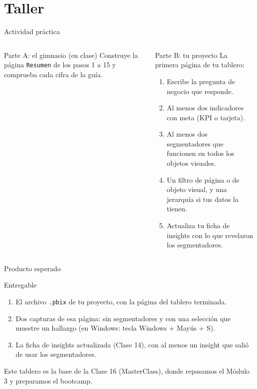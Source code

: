 \documentclass[aspectratio=169,11pt]{beamer}
\begin{document}
\section{Taller}
\begin{frame}[t]{Actividad práctica}
  \begin{columns}[T,onlytextwidth]
    \begin{block}{Parte A: el gimnasio (en clase)}
      \small Construye la página \texttt{Resumen} de los pasos 1 a 15 y
      comprueba cada cifra de la guía.
    \end{block}
    \begin{alertblock}{Parte B: tu proyecto}
      \small La primera página de tu tablero:
      \begin{enumerate}
        \footnotesize
        \item Escribe la pregunta de negocio que responde.
        \item Al menos dos indicadores con meta (KPI o tarjeta).
        \item Al menos dos segmentadores que funcionen en todos los
          objetos visuales.
        \item Un filtro de página o de objeto visual, y una jerarquía si
          tus datos la tienen.
        \item Actualiza tu ficha de insights con lo que revelaron los
          segmentadores.
      \end{enumerate}
    \end{alertblock}
  \end{columns}
\end{frame}

\begin{frame}[t]{Producto esperado}
  \begin{exampleblock}{Entregable}
    \small
    \begin{enumerate}
      \item El archivo \texttt{.pbix} de tu proyecto, con la página del
        tablero terminada.
      \item Dos capturas de esa página: sin segmentadores y con una
        selección que muestre un hallazgo (en Windows: tecla Windows + Mayús
        + S).
      \item La ficha de insights actualizada (Clase 14), con al menos un
        insight que salió de usar los segmentadores.
    \end{enumerate}
  \end{exampleblock}
  \small Este tablero es la base de la Clase 16 (MasterClass), donde
  repasamos el Módulo 3 y preparamos el bootcamp.
\end{frame}
\end{document}
